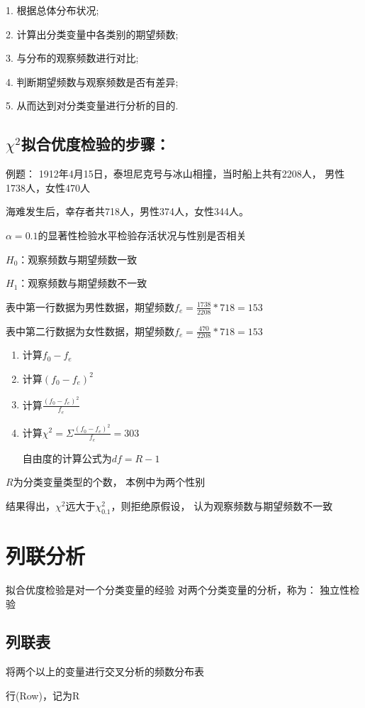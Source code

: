 \documentclass[UTF8,10pt]{book}
\begin{document}
1. 根据总体分布状况; 

2. 计算出分类变量中各类别的期望频数; 

3. 与分布的观察频数进行对比; 

4. 判断期望频数与观察频数是否有差异; 

5. 从而达到对分类变量进行分析的目的.	

\subsection{$\chi^2$拟合优度检验的步骤：} 
例题：
1912年4月15日，泰坦尼克号与冰山相撞，当时船上共有2208人，
男性1738人，女性470人 

海难发生后，幸存者共718人，男性374人，女性344人。

$\alpha=0.1$的显著性检验水平检验存活状况与性别是否相关	

$H_0$：观察频数与期望频数一致 

$H_1$：观察频数与期望频数不一致 

表中第一行数据为男性数据，期望频数$f_e = \frac{1738}{2208} * 718 = 153$ 

表中第二行数据为女性数据，期望频数$f_e = \frac{470}{2208} * 718 = 153$ 


\begin{enumerate}
	\item 计算$f_0 -f_e$ 
	\item 计算$(f_0 -f_e)^2$ 
	\item 计算$\frac{(f_0 -f_e)^2}{f_e}$ 
	\item 计算$\chi^2 = \Sigma \frac{(f_0-f_e)^2}{f_e} = 303 $
	
	自由度的计算公式为$df = R - 1 $
\end{enumerate}  

$R$为分类变量类型的个数，
本例中为两个性别 

结果得出，$\chi^2$远大于$\chi_{0.1}^2$，则拒绝原假设，
认为观察频数与期望频数不一致	

\section{列联分析}
拟合优度检验是对一个分类变量的经验 对两个分类变量的分析，称为：	独立性检验	

\subsection{列联表}	
将两个以上的变量进行交叉分析的频数分布表 

行(Row)，记为R 
\end{document}
